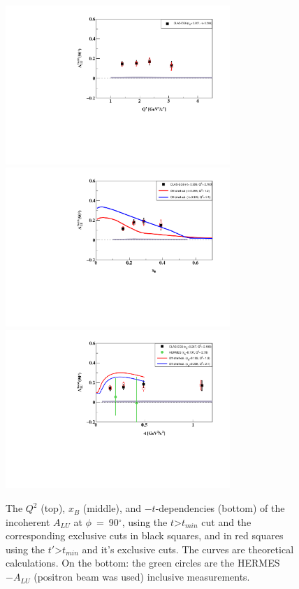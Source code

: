 \documentclass[a4paper,11pt,twoside]{article}
\begin{document}
\begin{figure}[h!]
   \centering
   \includegraphics[height=6.0cm]{fig/ALU_90_p_vs_Q2_shortscenrario.pdf}\\
   \includegraphics[height=6.0cm]{fig/ALU_90_p_vs_x_shortscenrario.pdf}\\
   \includegraphics[height=6.0cm]{fig/ALU_90_p_vs_t_shortscenrario.pdf}
   \caption{The $Q^{2}$ (top), $x_{B}$ (middle), and $-t$-dependencies (bottom) 
      of the incoherent $A_{LU}$ at $\phi$~=~90$^{\circ}$, using the 
   $t$>$t_{min}$ cut and the corresponding exclusive cuts in black squares, and 
in red squares using the $t'$>$t_{min}$ and it's exclusive cuts.  The curves 
are theoretical calculations. On the bottom: the green circles are the HERMES 
$-A_{LU}$ (positron beam was used) inclusive measurements.}
\label{fig:incoh_Q2_xB_t_ALU}
\end{figure}
\end{document}
